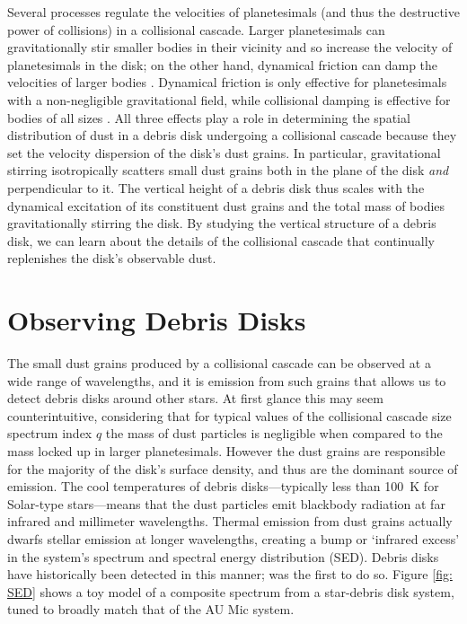 \documentclass[12pt,oneside]{book}
\begin{document}
Several processes regulate the velocities of planetesimals (and thus the destructive power of collisions) in a collisional cascade.
Larger planetesimals can gravitationally stir smaller bodies in their vicinity and so increase the velocity of planetesimals in the disk; on the other hand, dynamical friction can damp the velocities of larger bodies \citep{kenyon&bromley01}.
Dynamical friction is only effective for planetesimals with a non-negligible gravitational field, while collisional damping is effective for bodies of all sizes \citep{kenyon&luu99}.
All three effects play a role in determining the spatial distribution of dust in a debris disk undergoing a collisional cascade because they set the velocity dispersion of the disk's dust grains.
In particular, gravitational stirring isotropically scatters small dust grains both in the plane of the disk \textit{and} perpendicular to it.
The vertical height of a debris disk thus scales with the dynamical excitation of its constituent dust grains and the total mass of bodies gravitationally stirring the disk.
By studying the vertical structure of a debris disk, we can learn about the details of the collisional cascade that continually replenishes the disk's observable dust.

\section{Observing Debris Disks}
\label{observing intro}

The small dust grains produced by a collisional cascade can be observed at a wide range of wavelengths, and it is emission from such grains that allows us to detect debris disks around other stars.
At first glance this may seem counterintuitive, considering that for typical values of the collisional cascade size spectrum index $q$ the mass of dust particles is negligible when compared to the mass locked up in larger planetesimals.
However the dust grains are responsible for the majority of the disk's surface density, and thus are the dominant source of emission.
The cool temperatures of debris disks---typically less than \SI{100}{K} for Solar-type stars---means that the dust particles emit blackbody radiation at far infrared and millimeter wavelengths.
Thermal emission from dust grains actually dwarfs stellar emission at longer wavelengths, creating a bump or `infrared excess' in the system's spectrum and spectral energy distribution (SED).
Debris disks have historically been detected in this manner; \cite{aumann84} was the first to do so.
Figure \ref{fig: SED} shows a toy model of a composite spectrum from a star-debris disk system, tuned to broadly match that of the AU Mic system.
\end{document}
